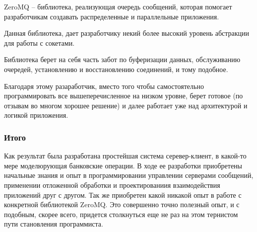 \documentclass[12pt]{article}
\begin{document}
ZeroMQ -- библиотека, реализующая очередь сообщений, которая помогает разработчикам создавать распределенные и параллельные приложения.

Данная библиотека, дает разработчику некий более высокий уровень абстракции для работы с сокетами.

Библиотека берет на себя часть забот по буферизации данных, обслуживанию очередей, установлению и восстановлению соединений, и тому подобное. 

Благодаря этому разаработчик, вместо того чтобы самостоятельно программировать все вышеперечисленное на низком уровне, берет готовое (по отзывам во многом хорошее решение) и далее работает уже над архитектурой и логикой приложения.

\subsubsection*{Итого}

Как результат была разработана простейшая система серевер-клиент, в какой-то мере моделюрующая банковские операции. В ходе ее разработки приобретены начальные знания и опыт в программировании управлении серверами сообщений, применении отложенной обработки и проектированиия взаимодействия приложений друг с другом. Так же приобретен какой никакой опыт в работе с конкретной библиотекой ZeroMQ. Это совершенно точно полезный опыт, и с подобным, скорее всего, придется столкнуться еще не раз на этом тернистом пути становления программиста. 
\end{document}
